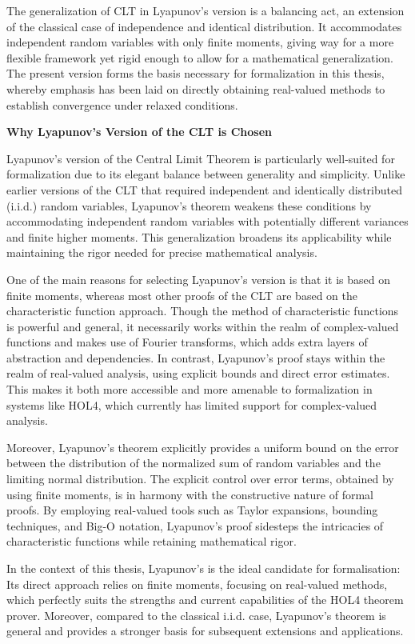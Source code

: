 The generalization of CLT in Lyapunov's version is a balancing act, an extension of the classical case of independence and identical distribution. It accommodates independent random variables with only finite moments, giving way for a more flexible framework yet rigid enough to allow for a mathematical generalization. The present version forms the basis necessary for formalization in this thesis, whereby emphasis has been laid on directly obtaining real-valued methods to establish convergence under relaxed conditions.

\textbf{Why Lyapunov's Version of the CLT is Chosen}

Lyapunov’s version of the Central Limit Theorem is particularly well-suited for formalization due to its elegant balance between generality and simplicity. Unlike earlier versions of the CLT that required independent and identically distributed (i.i.d.) random variables, Lyapunov’s theorem weakens these conditions by accommodating independent random variables with potentially different variances and finite higher moments. This generalization broadens its applicability while maintaining the rigor needed for precise mathematical analysis.

One of the main reasons for selecting Lyapunov's version is that it is based on finite moments, whereas most other proofs of the CLT are based on the characteristic function approach. Though the method of characteristic functions is powerful and general, it necessarily works within the realm of complex-valued functions and makes use of Fourier transforms, which adds extra layers of abstraction and dependencies. In contrast, Lyapunov's proof stays within the realm of real-valued analysis, using explicit bounds and direct error estimates. This makes it both more accessible and more amenable to formalization in systems like HOL4, which currently has limited support for complex-valued analysis.

Moreover, Lyapunov's theorem explicitly provides a uniform bound on the error between the distribution of the normalized sum of random variables and the limiting normal distribution. The explicit control over error terms, obtained by using finite moments, is in harmony with the constructive nature of formal proofs. By employing real-valued tools such as Taylor expansions, bounding techniques, and Big-O notation, Lyapunov's proof sidesteps the intricacies of characteristic functions while retaining mathematical rigor.

In the context of this thesis, Lyapunov's is the ideal candidate for formalisation: Its direct approach relies on ﬁnite moments, focusing on real-valued methods, which perfectly suits the strengths and current capabilities of the HOL4 theorem prover. Moreover, compared to the classical i.i.d. case, Lyapunov's theorem is general  and provides a stronger basis for subsequent extensions and applications.

